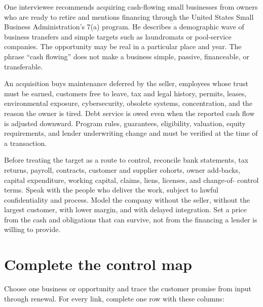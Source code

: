 One interviewee recommends acquiring cash-flowing small businesses from owners who
are ready to retire and mentions financing through the United States Small
Business Administration's 7(a) program. He describes a demographic wave of
business transfers and simple targets such as laundromats or pool-service
companies. The opportunity may be real in a particular place and year. The
phrase ``cash flowing'' does not make a business simple, passive, financeable,
or transferable.

An acquisition buys maintenance deferred by the seller, employees whose trust
must be earned, customers free to leave, tax and legal history, permits,
leases, environmental exposure, cybersecurity, obsolete systems, concentration,
and the reason the owner is tired. Debt service is owed even when the reported
cash flow is adjusted downward. Program rules, guarantees, eligibility,
valuation, equity requirements, and lender underwriting change and must be
verified at the time of a transaction.

Before treating the target as a route to control, reconcile bank statements,
tax returns, payroll, contracts, customer and supplier cohorts, owner add-backs,
capital expenditure, working capital, claims, liens, licenses, and change-of-
control terms. Speak with the people who deliver the work, subject to lawful
confidentiality and process. Model the company without the seller, without the
largest customer, with lower margin, and with delayed integration. Set a price
from the cash and obligations that can survive, not from the financing a lender
is willing to provide.

\section{Complete the control map}

Choose one business or opportunity and trace the customer promise from input
through renewal. For every link, complete one row with these columns:

